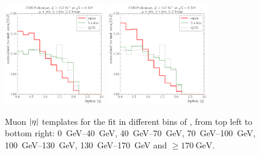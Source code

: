 \begin{figure}[!htbp]
    \hspace*{\fill} \\
    \hspace*{\fill}
    {\includegraphics[width=0.39\textwidth]{measurement/WPT/central/fit_templates/muon_templates_bin_130-170}}\hfill
    {\includegraphics[width=0.39\textwidth]{measurement/WPT/central/fit_templates/muon_templates_bin_170-inf}}
    \hspace*{\fill}
    \caption[Muon $\abs \eta$ templates for the fit in different bins of \WPT]{Muon $\abs \eta$ templates for the fit
    in different bins of \WPT, from top left to bottom right: \SIrange{0}{40}{\GeV}, \SIrange{40}{70}{\GeV},
    \SIrange{70}{100}{\GeV}, \SIrange{100}{130}{\GeV}, \SIrange{130}{170}{\GeV} and $\geq \SI{170}{\GeV}$.}
    \label{fig:fit_templates_WPT_muon}
\end{figure}


\newpage
{}

